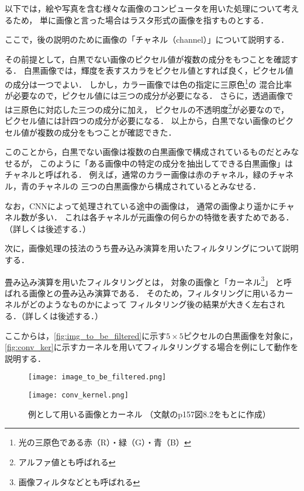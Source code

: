 \documentclass[\homedir/main.tex]{subfiles}
\begin{document}
以下では，絵や写真を含む様々な画像のコンピュータを用いた処理について考えるため，
単に画像と言った場合はラスタ形式の画像を指すものとする．

ここで，後の説明のために画像の「チャネル（channel）」について説明する．

その前提として，白黒でない画像のピクセル値が複数の成分をもつことを確認する．
白黒画像では，輝度を表すスカラをピクセル値とすれば良く，ピクセル値の成分は一つでよい．
しかし，カラー画像では色の指定に三原色\footnote{光の三原色である赤（R）・緑（G）・青（B）}の
混合比率が必要なので，ピクセル値には三つの成分が必要になる．
さらに，透過画像では三原色に対応した三つの成分に加え，
ピクセルの不透明度\footnote{アルファ値とも呼ばれる}が必要なので，
ピクセル値には計四つの成分が必要になる．
以上から，白黒でない画像のピクセル値が複数の成分をもつことが確認できた．

このことから，白黒でない画像は複数の白黒画像で構成されているものだとみなせるが，
このように「ある画像中の特定の成分を抽出してできる白黒画像」はチャネルと呼ばれる．
例えば，通常のカラー画像は赤のチャネル，緑のチャネル，青のチャネルの
三つの白黒画像から構成されているとみなせる．

なお，CNNによって処理されている途中の画像は，
通常の画像より遥かにチャネル数が多い．
これは各チャネルが元画像の何らかの特徴を表すためである．
（詳しくは後述する．）

次に，画像処理の技法のうち畳み込み演算を用いたフィルタリングについて説明する．

畳み込み演算を用いたフィルタリングとは，
対象の画像と「カーネル\footnote{画像フィルタなどとも呼ばれる}」
と呼ばれる画像との畳み込み演算である．
そのため，フィルタリングに用いるカーネルがどのようなものかによって
フィルタリング後の結果が大きく左右される．（詳しくは後述する．）

ここからは，\cref{fig:img_to_be_filtered}に示す\(5 \times 5\)ピクセルの白黒画像を対象に，
\cref{fig:conv_ker}に示すカーネルを用いてフィルタリングする場合を例にして動作を説明する．

\begin{figure}[h]
    \centering
    \begin{minipage}[b]{0.375\linewidth}
        \centering
        \texttt{[image: image\_to\_be\_filtered.png]}
        \label{fig:img_to_be_filtered}
    \end{minipage}
    \begin{minipage}[b]{0.375\linewidth}
        \centering
        \texttt{[image: conv\_kernel.png]}
        \label{fig:conv_ker}
    \end{minipage}
    \caption[フィルタリングの例に用いる画像とカーネル]{
        例として用いる画像とカーネル \linebreak
        （文献\cite{fujita2017}のp157図8.2をもとに作成）
    }
    \label{fig:conv_operand}
\end{figure}
\end{document}
